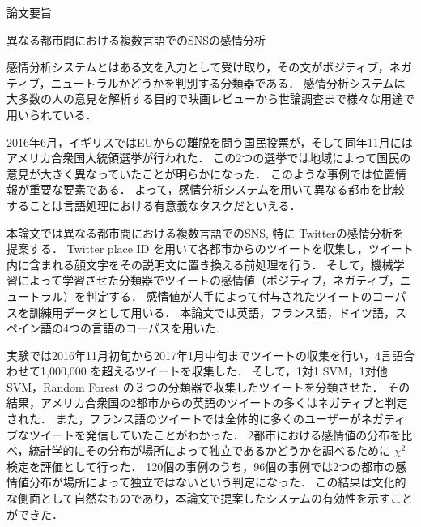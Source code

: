 \thispagestyle{empty}
\vspace*{2.0cm}

\begin{center}
\LARGE{論文要旨}
\end{center}
\vspace*{3mm}

\begin{center}
\LARGE{異なる都市間における複数言語でのSNSの感情分析}
\end{center}

\vspace{20mm}
\setlength\parindent{1zw}
感情分析システムとはある文を入力として受け取り，その文がポジティブ，ネガティブ，ニュートラルかどうかを判別する分類器である．
感情分析システムは大多数の人の意見を解析する目的で映画レビューから世論調査まで様々な用途で用いられている．

2016年6月，イギリスではEUからの離脱を問う国民投票が，そして同年11月にはアメリカ合衆国大統領選挙が行われた．
この2つの選挙では地域によって国民の意見が大きく異なっていたことが明らかになった．
このような事例では位置情報が重要な要素である．
よって，感情分析システムを用いて異なる都市を比較することは言語処理における有意義なタスクだといえる．

本論文では異なる都市間における複数言語でのSNS, 特に Twitterの感情分析を提案する．
Twitter place ID を用いて各都市からのツイートを収集し，ツイート内に含まれる顔文字をその説明文に置き換える前処理を行う．
そして，機械学習によって学習させた分類器でツイートの感情値（ポジティブ，ネガティブ，ニュートラル）を判定する．
感情値が人手によって付与されたツイートのコーパスを訓練用データとして用いる．
本論文では英語，フランス語，ドイツ語，スペイン語の4つの言語のコーパスを用いた.

実験では2016年11月初旬から2017年1月中旬までツイートの収集を行い，4言語合わせて1,000,000 を超えるツイートを収集した．
そして，1対1 SVM，1対他 SVM，Random Forest の３つの分類器で収集したツイートを分類させた．
その結果，アメリカ合衆国の2都市からの英語のツイートの多くはネガティブと判定された．
また，フランス語のツイートでは全体的に多くのユーザーがネガティブなツイートを発信していたことがわかった．
2都市における感情値の分布を比べ，統計学的にその分布が場所によって独立であるかどうかを調べるために $\chi^2$ 検定を評価として行った．
120個の事例のうち，96個の事例では2つの都市の感情値分布が場所によって独立ではないという判定になった．
この結果は文化的な側面として自然なものであり，本論文で提案したシステムの有効性を示すことができた．

